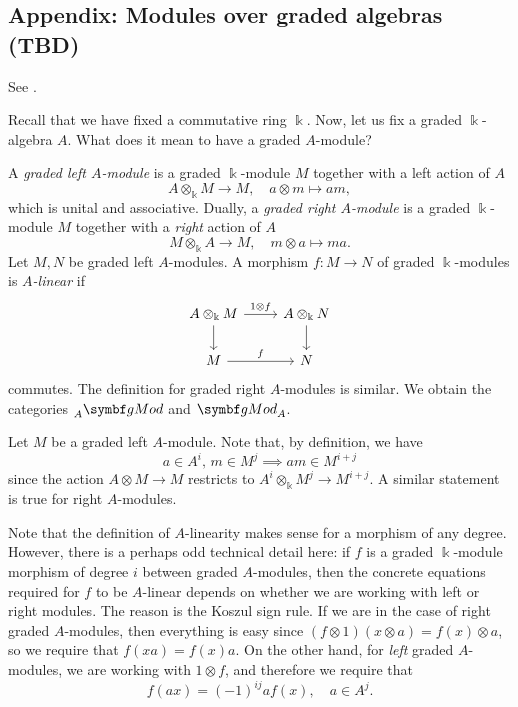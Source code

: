 \subsection{Appendix: Modules over graded algebras (TBD)}
See \cite[Lemma 3.1.30]{doi:10.1017/9781108292825}.

Recall that we have fixed a commutative ring \(\Bbbk\). Now, let us fix a graded \(\Bbbk\)-algebra \(A\). What does it mean to have a graded \(A\)-module?
\begin{definition}
	A \emph{graded left \(A\)-module} is a graded \(\Bbbk\)-module \(M\) together with a left action of \(A\)
	\[ A\otimes_\Bbbk M \to M,\quad a\otimes m \mapsto am, \]
	which is unital and associative. Dually, a \emph{graded right \(A\)-module} is a graded \(\Bbbk\)-module \(M\) together with a \emph{right} action of \(A\)
	\[ M\otimes_\Bbbk A \to M, \quad m\otimes a \mapsto ma. \]
	Let \(M,N\) be graded left \(A\)-modules. A morphism \(f\!:M\to N\) of graded \(\Bbbk\)-modules is \emph{\(A\)-linear} if
	\[
	\begin{tikzcd}
		A\otimes_\Bbbk M \ar[d]\ar[r,"1\otimes f"] & A\otimes_\Bbbk N\ar[d] \\
		M \ar[r,"f"] & N
	\end{tikzcd}
	\]
	commutes. The definition for graded right \(A\)-modules is similar. We obtain the categories \(\prescript{}{A}{\gMod}\) and \(\gMod_A\).
\end{definition}
\begin{remark}
	Let \(M\) be a graded left \(A\)-module. Note that, by definition, we have
	\[ a\in A^i,\, m\in M^j \implies am\in M^{i+j} \]
	since the action \(A\otimes M \to M\) restricts to \(A^i \otimes_\Bbbk M^j \to M^{i+j}\). A similar statement is true for right \(A\)-modules.
\end{remark}
\begin{remark}
	Note that the definition of \(A\)-linearity makes sense for a morphism of any degree. However, there is a perhaps odd technical detail here:
	if \(f\) is a graded \(\Bbbk\)-module morphism of degree \(i\) between graded \(A\)-modules, then the concrete equations required for \(f\) to be \(A\)-linear
	depends on whether we are working with left or right modules. The reason is the Koszul sign rule. If we are in the case of right graded \(A\)-modules,
	then everything is easy since \((f\otimes 1)(x\otimes a) = f(x)\otimes a\), so we require that \(f(xa) = f(x)a\). On the other hand, for
	\emph{left} graded \(A\)-modules, we are working with \(1\otimes f\), and therefore we require that
	\[ f(ax) = (-1)^{ij}af(x),\quad a\in A^j. \]
\end{remark}
